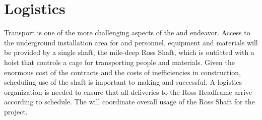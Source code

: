\section{Logistics}
\label{sec:fdsp-tc-log}



Transport is one of the more challenging aspects of the  and  endeavor.  Access to the underground installation area for  and  personnel, equipment and materials will be provided by a single shaft, the mile-deep Ross Shaft, which is outfitted with a hoist that controls a cage for transporting people and materials.  
%
Given the enormous cost of the  contracts and the costs of inefficiencies in construction, scheduling use of the shaft is important to making  and  successful. A logistics organization is needed to ensure that all deliveries to the Ross Headframe arrive according to schedule. The    will coordinate overall usage of the Ross Shaft for the project. 


